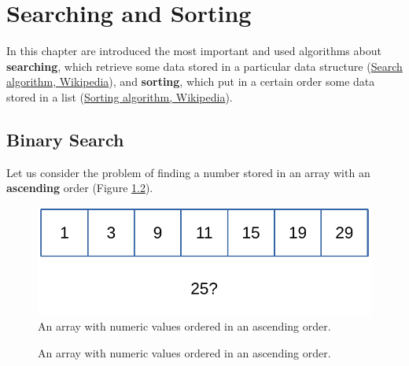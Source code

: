 \chapter{Searching and Sorting}
\label{chp: searchandsorting}
In this chapter are introduced the most important and used algorithms about \textbf{searching}, which retrieve some data stored in a particular data structure \cite{wikisearch} (\href{https://en.wikipedia.org/wiki/Search_algorithm}{Search algorithm, Wikipedia}), and \textbf{sorting}, which put in a certain order some data stored in a list \cite{wikisorting} (\href{https://en.wikipedia.org/wiki/Sorting_algorithm}{Sorting algorithm, Wikipedia}).
\section{Binary Search}
Let us consider the problem of finding a number stored in an array with an \textbf{ascending} order (Figure \ref{sorting_1}).

\begin{figure}[H]
	\begin{center}
		\includegraphics[scale=.6]{chapters/searchandsorting/images/sorting_1.pdf}
		\caption[An array with numeric values ordered in an ascending order.]{An array with numeric values ordered in an ascending order.}
		\label{sorting_1}
	\end{center}
\end{figure}

\begin{figure}[H]
\centering
{}
\caption[An array with numeric values ordered in an ascending order.]{An array with numeric values ordered in an ascending order.}
\label{sorting_1}
\end{figure}

